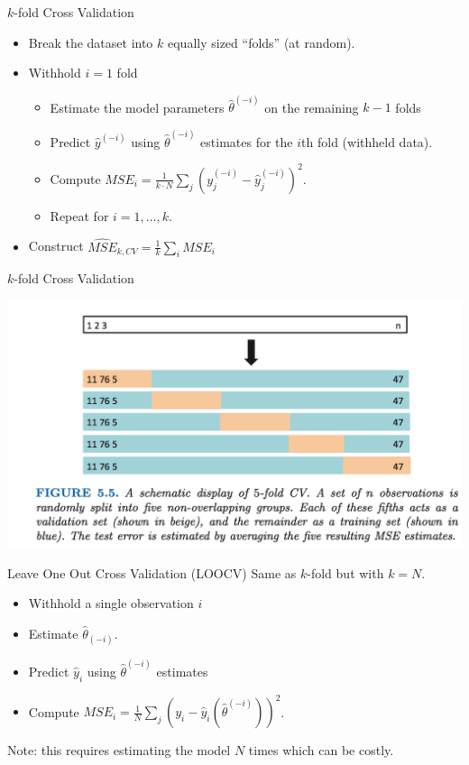 \documentclass[11pt, aspectratio=169]{beamer}
\begin{document}
\begin{frame}{$k$-fold Cross Validation}
  \begin{itemize}
  \item Break the dataset into $k$ equally sized ``folds'' (at random).
  \item Withhold $i=1$ fold
  \begin{itemize}
  \item Estimate the model parameters $\hat{\theta}^{(-i)}$ on the remaining $k-1$ folds
  \item Predict $\hat{y}^{(-i)}$ using $\hat{\theta}^{(-i)}$ estimates for the $i$th fold (withheld data).
  \item Compute $MSE_i =\frac{1}{k \cdot N} \sum_j (y^{(-i)}_j -\hat{y}^{(-i)}_j)^2$.
  \item Repeat for $i=1,\ldots,k$.
  \end{itemize}
  \item Construct $\widehat{MSE}_{k,CV} = \frac{1}{k} \sum_i MSE_{i}$
  \end{itemize}
\end{frame}
  
\begin{frame}{$k$-fold Cross Validation}
  \begin{center}
  \includegraphics[width=\textwidth]{./resources/split-cv5}
  \end{center}
\end{frame}

\begin{frame}{Leave One Out Cross Validation (LOOCV)}
  Same as $k$-fold but with $k=N$.
  \begin{itemize}
  \item Withhold a single observation $i$
  \item Estimate $\hat{\theta}_{(-i)}$.
  \item Predict $\hat{y}_i$ using $\hat{\theta}^{(-i)}$ estimates
  \item Compute $MSE_i =\frac{1}{N} \sum_j (y_i -\hat{y}_i(\hat{\theta}^{(-i)}))^2$.
  \end{itemize}
  \vspace{0.2cm}
  Note: this requires estimating the model $N$ times which can be costly.
\end{frame}
    
\end{document}
